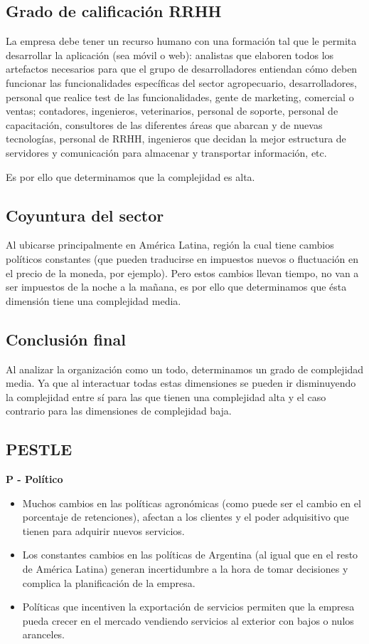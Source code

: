 \documentclass[man,12pt]{apa7}
\begin{document}
\subsection{Grado de calificación RRHH}

La empresa debe tener un recurso humano con una formación tal que le permita desarrollar la aplicación (sea móvil o web): analistas que elaboren todos los artefactos necesarios para que el grupo de desarrolladores entiendan cómo deben funcionar las funcionalidades específicas del sector agropecuario, desarrolladores, personal que realice test de las funcionalidades, gente de marketing, comercial o ventas; contadores, ingenieros, veterinarios, personal de soporte, personal de capacitación, consultores de las diferentes áreas que abarcan y de nuevas tecnologías, personal de RRHH, ingenieros que decidan la mejor estructura de servidores y comunicación para almacenar y transportar información, etc.

Es por ello que determinamos que la complejidad es alta.

\subsection{Coyuntura del sector}

Al ubicarse principalmente en América Latina, región la cual tiene cambios políticos constantes (que pueden traducirse en impuestos nuevos o fluctuación en el precio de la moneda, por ejemplo). Pero estos cambios llevan tiempo, no van a ser impuestos de la noche a la mañana, es por ello que determinamos que ésta dimensión tiene una complejidad media.

\subsection{Conclusión final}

Al analizar la organización como un todo, determinamos un grado de complejidad media. Ya que al interactuar todas estas dimensiones se pueden ir disminuyendo la complejidad entre sí para las que tienen una complejidad alta y el caso contrario para las dimensiones de complejidad baja.

\subsection{PESTLE}

\textbf{P - Político}
\begin{itemize}
    \item Muchos cambios en las políticas agronómicas (como puede ser el cambio en el porcentaje de retenciones), afectan a los clientes y el poder adquisitivo que tienen para adquirir nuevos servicios.
    \item Los constantes cambios en las políticas de Argentina (al igual que en el resto de América Latina) generan incertidumbre a la hora de tomar decisiones y complica la planificación de la empresa.
    \item Políticas que incentiven la exportación de servicios permiten que la empresa pueda crecer en el mercado vendiendo servicios al exterior con bajos o nulos aranceles.
\end{itemize}
\end{document}
